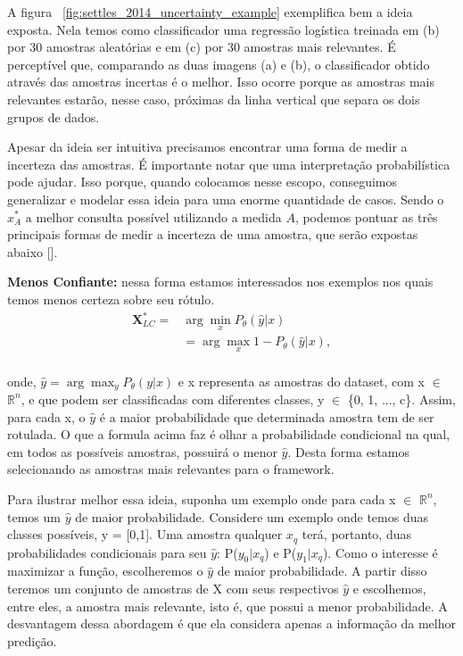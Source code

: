 A figura ~\ref{fig:settles_2014_uncertainty_example} exemplifica bem a ideia exposta. Nela temos como classificador uma regressão logística treinada em (b) por 30 amostras aleatórias e em (c) por 30 amostras mais relevantes. É perceptível que, comparando as duas imagens (a) e (b), o classificador obtido através das amostras incertas é o melhor. Isso ocorre porque as amostras mais relevantes estarão, nesse caso, próximas da linha vertical que separa os dois grupos de dados.

Apesar da ideia ser intuitiva precisamos encontrar uma forma de medir a incerteza das amostras. É importante notar que uma interpretação probabilística pode ajudar. Isso porque, quando colocamos nesse escopo, conseguimos generalizar e modelar essa ideia para uma enorme quantidade de casos. Sendo o $x^*_{A}$ a melhor consulta possível utilizando a medida $A$, podemos pontuar as três principais formas de medir a incerteza de uma amostra, que serão expostas abaixo [\cite{settles2014active}].


\textbf{Menos Confiante:} nessa forma estamos interessados nos exemplos nos quais temos menos certeza sobre seu rótulo.
\begin{align*}
\textbf{X}^*_{LC} = &\arg\min_{x} P_{\theta}  (\hat{y}\lvert x)\\
& = \arg\max_{x} 1 - P_{\theta}  (\hat{y}\lvert x),\\
\end{align*}

onde, $\hat{y} = \arg\max_{y} P_{\theta} (y\lvert x)$ e x representa as amostras do dataset, com x $\in$ $\mathbb{R}^n$, e que podem ser classificadas com diferentes classes, y $\in$ \{0, 1, ..., c\}. Assim, para cada x, o $\hat{y}$ é a maior probabilidade que determinada amostra tem de ser rotulada. O que a formula acima faz é olhar a probabilidade condicional na qual, em todos as possíveis amostras, possuirá o menor $\hat{y}$. Desta forma estamos selecionando as amostras mais relevantes para o framework.


Para ilustrar melhor essa ideia, suponha um exemplo onde para cada x $\in$ $\mathbb{R}^n$, temos um $\hat{y}$ de maior probabilidade. Considere um exemplo onde temos duas classes possíveis, y = [0,1]. Uma amostra qualquer $x_q$ terá, portanto, duas probabilidades condicionais para seu $\hat{y}$: P($y_0 \lvert x_q$) e P($y_1 \lvert x_q$). Como o interesse é maximizar a função, escolheremos o $\hat{y}$ de maior probabilidade. A partir disso teremos um conjunto de amostras de X com seus respectivos $\hat{y}$ e escolhemos, entre eles, a amostra mais relevante, isto é, que possui a menor probabilidade. A desvantagem dessa abordagem é que ela considera apenas a informação da melhor predição.  


